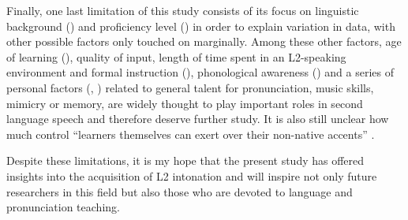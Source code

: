 Finally, one last limitation of this study consists of its focus on linguistic background () and proficiency level () in order to explain variation in data, with other possible factors only touched on marginally. Among these other factors, age of learning (), quality of input, length of time spent in an L2-speaking environment and formal instruction (), phonological awareness () and a series of personal factors (, ) related to general talent for pronunciation, music skills, mimicry or memory, are widely thought to play important roles in second language speech and therefore deserve further study. It is also still unclear how much control “learners themselves can exert over their non-native accents” \citep[146]{Cutler2014}.



Despite these limitations, it is my hope that the present study has offered insights into the acquisition of L2 intonation and will inspire not only future researchers in this field but also those who are devoted to language and pronunciation teaching.
